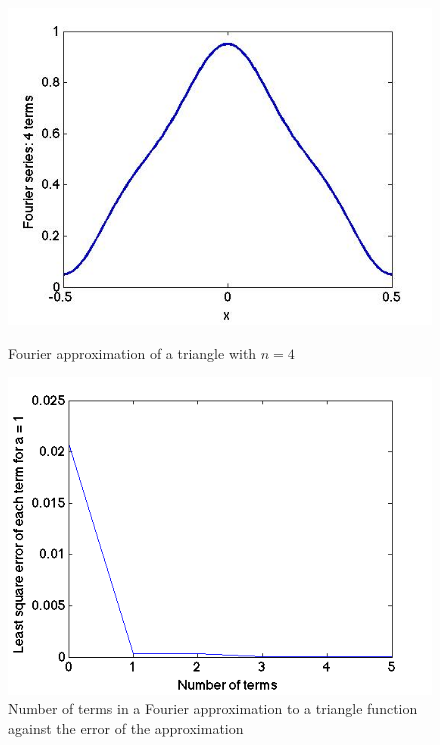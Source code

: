 \documentclass{article}
\begin{document}
\begin{figure}[h]
\centering
	\begin{minipage}[c][][b]{0.45\linewidth}
		\begin{center}
		\includegraphics[scale=0.35]{Matlab/Fourier/Images/fs_triangle4.jpg}  
		\end{center}
		\caption[b]{Fourier approximation of a triangle with $n = 4$}
		\label{fourierapproximationtriangle}
	\end{minipage}
\quad\quad\quad\quad
	\begin{minipage}[c][][b]{0.45\linewidth}
		\begin{center}
		\includegraphics[scale=0.35]{Matlab/Fourier/Images/errorAEquals1.png}
		\end{center}
		\caption[b]{Number of terms in a Fourier approximation to a triangle function against the error of the approximation}
		\label{numberoffourierterms}
	\end{minipage}
\end{figure}
\end{document}

